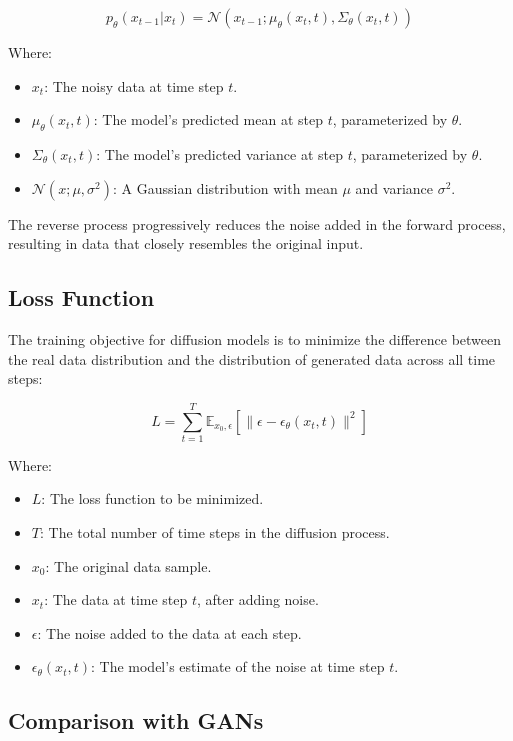 \begin{equation}
p_\theta(x_{t-1} | x_t) = \mathcal{N}(x_{t-1}; \mu_\theta(x_t, t), \Sigma_\theta(x_t, t))
\end{equation}

Where:
\begin{itemize}
    \item \(x_t\): The noisy data at time step \(t\).
    \item \(\mu_\theta(x_t, t)\): The model's predicted mean at step \(t\), parameterized by \(\theta\).
    \item \(\Sigma_\theta(x_t, t)\): The model's predicted variance at step \(t\), parameterized by \(\theta\).
    \item \(\mathcal{N}(x; \mu, \sigma^2)\): A Gaussian distribution with mean \(\mu\) and variance \(\sigma^2\).
\end{itemize}

The reverse process progressively reduces the noise added in the forward process, resulting in data that closely resembles the original input.

\subsection{Loss Function}
The training objective for diffusion models is to minimize the difference between the real data distribution and the distribution of generated data across all time steps:

\begin{equation}
L = \sum_{t=1}^{T} \mathbb{E}_{x_0, \epsilon} [\|\epsilon - \epsilon_\theta(x_t, t)\|^2]
\end{equation}

Where:
\begin{itemize}
    \item \(L\): The loss function to be minimized.
    \item \(T\): The total number of time steps in the diffusion process.
    \item \(x_0\): The original data sample.
    \item \(x_t\): The data at time step \(t\), after adding noise.
    \item \(\epsilon\): The noise added to the data at each step.
    \item \(\epsilon_\theta(x_t, t)\): The model's estimate of the noise at time step \(t\).
\end{itemize}

\subsection{Comparison with GANs}

